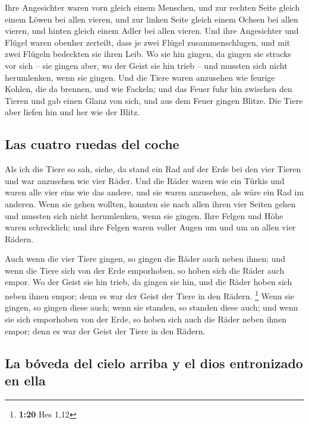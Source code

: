  Ihre Angesichter waren vorn gleich einem Menschen, und
zur rechten Seite gleich einem Löwen bei allen vieren, und zur linken
Seite gleich einem Ochsen bei allen vieren, und hinten gleich einem
Adler bei allen vieren.  Und ihre Angesichter und Flügel
waren obenher zerteilt, dass je zwei Flügel zusammenschlugen, und mit
zwei Flügeln bedeckten sie ihren Leib.  Wo sie hin
gingen, da gingen sie stracks vor sich -- sie gingen aber, wo der Geist
sie hin trieb -- und mussten sich nicht herumlenken, wenn sie gingen.
 Und die Tiere waren anzusehen wie feurige Kohlen, die da
brennen, und wie Fackeln; und das Feuer fuhr hin zwischen den Tieren und
gab einen Glanz von sich, und aus dem Feuer gingen Blitze.
 Die Tiere aber liefen hin und her wie der Blitz.

\hypertarget{las-cuatro-ruedas-del-coche}{%
\subsection{Las cuatro ruedas del
coche}\label{las-cuatro-ruedas-del-coche}}

 Als ich die Tiere so sah, siehe, da stand ein Rad auf
der Erde bei den vier Tieren und war anzusehen wie vier Räder.
 Und die Räder waren wie ein Türkis und waren alle vier
eins wie das andere, und sie waren anzusehen, als wäre ein Rad im
anderen.  Wenn sie gehen wollten, konnten sie nach allen
ihren vier Seiten gehen und mussten sich nicht herumlenken, wenn sie
gingen.  Ihre Felgen und Höhe waren schrecklich; und ihre
Felgen waren voller Augen um und um an allen vier Rädern.

 Auch wenn die vier Tiere gingen, so gingen die Räder
auch neben ihnen; und wenn die Tiere sich von der Erde emporhoben, so
hoben sich die Räder auch empor.  Wo der Geist sie hin
trieb, da gingen sie hin, und die Räder hoben sich neben ihnen empor;
denn es war der Geist der Tiere in den Rädern. \footnote{\textbf{1:20}
  Hes 1,12}  Wenn sie gingen, so gingen diese auch; wenn
sie standen, so standen diese auch; und wenn sie sich emporhoben von der
Erde, so hoben sich auch die Räder neben ihnen empor; denn es war der
Geist der Tiere in den Rädern.

\hypertarget{la-buxf3veda-del-cielo-arriba-y-el-dios-entronizado-en-ella}{%
\subsection{La bóveda del cielo arriba y el dios entronizado en
ella}\label{la-buxf3veda-del-cielo-arriba-y-el-dios-entronizado-en-ella}}

